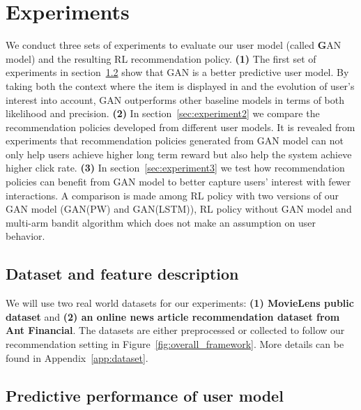 \documentclass{article} %
\begin{document}
\vspace{-3mm}
\section{Experiments}
\vspace{-3mm}

We conduct three sets of experiments to evaluate our user model (called {\textbf GAN} model) and the resulting RL recommendation policy. {\bf (1)} The first set of experiments in section~\ref{sec:experiment1} show that GAN is a better predictive user model. By taking both the context where the item is displayed in and the evolution of user's interest into account, GAN outperforms other baseline models in terms of both likelihood and precision. {\bf (2)} In section~\ref{sec:experiment2} we compare the recommendation policies developed from different user models. It is revealed from experiments that recommendation policies generated from GAN model can not only help users achieve higher long term reward but also help the system achieve higher click rate. {\bf (3)} In section~\ref{sec:experiment3} we test how recommendation policies can benefit from GAN model to better capture users' interest with fewer interactions. A comparison is made among RL policy with two versions of our GAN model (GAN(PW) and GAN(LSTM)), RL policy without GAN model and multi-arm bandit algorithm which does not make an assumption on user behavior.

\vspace{-3mm}
\subsection{Dataset and feature description}
\vspace{-3mm}

We will use two real world datasets for our experiments: {\bf (1) MovieLens public dataset} and {\bf (2) an online news article recommendation dataset from Ant Financial}. The datasets are either preprocessed or collected to follow our recommendation setting in Figure~\ref{fig:overall_framework}. More details can be found in Appendix~\ref{app:dataset}. 

\vspace{-3mm}
\subsection{Predictive performance of user model}\label{sec:experiment1}
\vspace{-3mm} 
\end{document}
